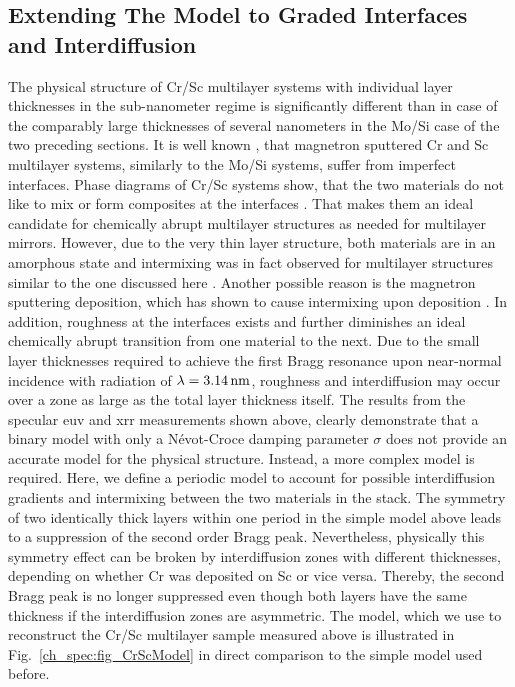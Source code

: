 \subsection{Extending The Model to Graded Interfaces and Interdiffusion} \label{ch_spec:sec_CrSc_gradual_model}
The physical structure of Cr/Sc multilayer systems with individual layer thicknesses in the sub-nanometer regime is significantly different than in case of the comparably large thicknesses of several nanometers in the Mo/Si case of the two preceding sections. It is well known \cite{prasciolu_thermal_2014}, that magnetron sputtered Cr and Sc multilayer systems, similarly to the Mo/Si systems, suffer from imperfect interfaces. Phase diagrams of Cr/Sc systems show, that the two materials do not like to mix or form composites at the interfaces \cite{boer_cohesion_1988}. That makes them an ideal candidate for chemically abrupt multilayer structures as needed for multilayer mirrors. However, due to the very thin layer structure, both materials are in an amorphous state and intermixing was in fact observed for multilayer structures similar to the one discussed here \cite{ghafoor_incorporation_2008}. Another possible reason is the magnetron sputtering deposition, which has shown to cause intermixing upon deposition \cite{eriksson_enhanced_2002}. In addition, roughness at the interfaces exists and further diminishes an ideal chemically abrupt transition from one material to the next. Due to the small layer thicknesses required to achieve the first Bragg resonance upon near-normal incidence with radiation of $\lambda=\nm{3.14}$, roughness and interdiffusion may occur over a zone as large as the total layer thickness itself. The results from the specular \gls{euv} and \gls{xrr} measurements shown above, clearly demonstrate that a binary model with only a N\'{e}vot-Croce damping parameter $\sigma$ does not provide an accurate model for the physical structure. Instead, a more complex model is required. Here, we define a periodic model to account for possible interdiffusion gradients and intermixing between the two materials in the stack. The symmetry of two identically thick layers within one period in the simple model above leads to a suppression of the second order Bragg peak. Nevertheless, physically this symmetry effect can be broken by interdiffusion zones with different thicknesses, depending on whether Cr was deposited on Sc or vice versa. Thereby, the second Bragg peak is no longer suppressed even though both layers have the same thickness if the interdiffusion zones are asymmetric. The model, which we use to reconstruct the Cr/Sc multilayer sample measured above is illustrated in Fig.~\ref{ch_spec:fig_CrScModel} in direct comparison to the simple model used before.
